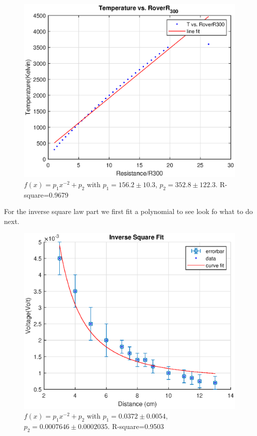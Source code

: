\documentclass[10pt,a4paper]{article}
\begin{document}
{\begin{figure}[H]
\includegraphics[scale=0.7]{RR.eps}
\caption{$f(x) = p_1x^{-2}+p_2$ with $p_1=156.2 \pm10.3$, $p_2=352.8\pm122.3$. R-square=0.9679}
\end{figure}
\par For the inverse square law part we first fit a polynomial to see look fo what to do next.
\begin{figure}[H]
	\advance{}
	\includegraphics[scale=0.7]{ISL.eps}
	\caption{$f(x) = p_1x^{-2}+p_2$ with $p_1=0.0372 \pm0.0054$, $p_2=0.0007646\pm0.0002035$. R-square=0.9503}	
\end{figure}
}
\end{document}
